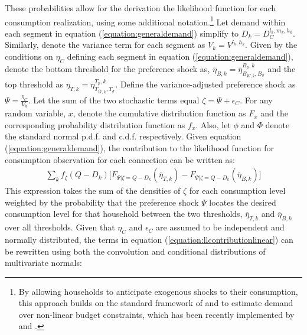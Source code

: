 \documentclass[12pt]{article}
\begin{document}
These probabilities allow for the derivation the likelihood function for each consumption realization, using some additional notation.\footnote{By allowing households to anticipate exogenous shocks to their consumption, this approach builds on the standard framework of \cite{burtless1978effect} and \cite{moffitt1986econometrics} to estimate demand over non-linear budget constraints, which has been recently implemented by \cite{szabo2015value} and \cite{mcrae2014infrastructure}.}  Let demand within each segment in equation (\ref{equation:generaldemand}) simplify to $D_k = D^{l_k,m_k,h_k}_C$.  Similarly, denote the variance term for each segment as $V_k = V^{l_k,h_k}$.  Given by the conditions on $\eta_C$ defining each segment in equation (\ref{equation:generaldemand}), denote the bottom threshold for the preference shock as, $\overline{\eta}_{B,k} = \overline{\eta}^{B_p,k}_{B_{\overline{W},k},B_{\sigma}}$ and the top threshold as $\overline{\eta}_{T,k} = \overline{\eta}^{T_p,k}_{T_{\overline{W},k},T_{\sigma}}$.  Define the variance-adjusted preference shock as $\Psi = \frac{\eta_C}{V_k}$.  Let the sum of the two stochastic terms equal $\zeta = \Psi + \epsilon_C$.  For any random variable, $x$, denote the cumulative distribution function as $F_x$ and the corresponding probability distribution function as $f_x$.  Also, let $\phi$ and $\Phi$ denote the standard normal p.d.f. and c.d.f. respectively.  Given equation (\ref{equation:generaldemand}), the contribution to the likelihood function for consumption observation for each connection can be written as:
\begin{align}\label{equation:llcontributionlinear}
\sum_{k} f_{\zeta}( Q - D_k ) \Big [ F_{ \Psi | \zeta = Q - D_k } (\overline{\eta}_{T,k}) - F_{ \Psi | \zeta = Q - D_k } (\overline{\eta}_{B,k})  \Big ]
\end{align}
This expression takes the sum of the densities of $\zeta$ for each consumption level weighted by the probability that the preference shock $\Psi$ locates the desired consumption level for that household between the two thresholds, $\overline{\eta}_{T,k}$ and $\overline{\eta}_{B,k}$ over all thresholds.  Given that $\eta_C$ and $\epsilon_C$ are assumed to be independent and normally distributed, the terms in equation (\ref{equation:llcontributionlinear}) can be rewritten using both the convolution and conditional distributions of multivariate normals:
\end{document}
